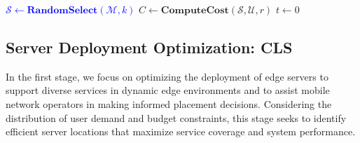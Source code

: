\documentclass[10pt, conference, letterpaper]{IEEEtran}
\newcommand{\rev}[1]{\textcolor{blue}{#1}}
\newcommand{\rev}[1]{#1}
\begin{document}
\addtolength{\topmargin}{0.06in}
\begin{algorithm}[!t]
    \caption{Coverage-based Local Search (CLS)}
    \label{algo:local_search}
    \rev{$\mathcal{S} \leftarrow \textbf{RandomSelect}(\mathcal{M},k)$}\;
    $C \leftarrow \textbf{ComputeCost}(\mathcal{S}, \mathcal{U}, r)$\;
    $t \leftarrow 0$\;


\end{algorithm}

\subsection{Server Deployment Optimization: CLS}
In the first stage, we focus on optimizing the deployment of edge servers to support diverse services in dynamic edge environments and to assist mobile network operators in making informed placement decisions. Considering the distribution of user demand and budget constraints, this stage seeks to identify efficient server locations that maximize service coverage and system performance. 
\end{document}

